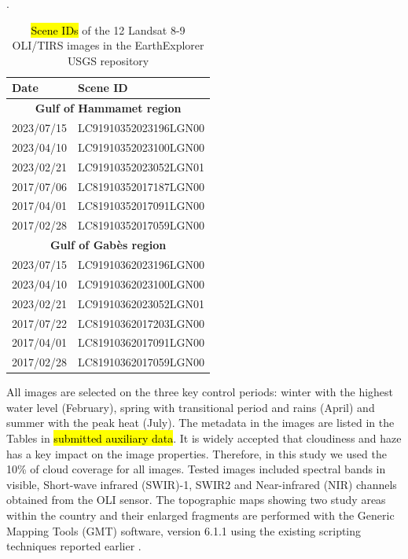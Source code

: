 \documentclass[land,article,submit,pdftex,moreauthors]{Definitions/mdpi}
\begin{document}
\begin{table}[H]
\caption{\hl{Scene IDs} of the 12 Landsat 8-9 OLI/TIRS images in the EarthExplorer USGS repository}.
\label{tab01}
\footnotesize
\begin{tabularx}{7cm}{l|l}

			\toprule
			\textbf{Date} & \textbf{Scene ID} \\
			\midrule
			\multicolumn{2}{c}{\textbf{Gulf of Hammamet region}}\\
			\midrule
			2023/07/15 & LC91910352023196LGN00 \\	
			2023/04/10 & LC91910352023100LGN00 \\	
			2023/02/21 & LC91910352023052LGN01 \\	
			2017/07/06 & LC81910352017187LGN00 \\	
			2017/04/01 & LC81910352017091LGN00 \\	
			2017/02/28 & LC81910352017059LGN00 \\	
			\midrule
			\multicolumn{2}{c}{\textbf{Gulf of Gabès region}}\\
			\midrule
			2023/07/15 & LC91910362023196LGN00 \\	
			2023/04/10 & LC91910362023100LGN00 \\	
			2023/02/21 & LC91910362023052LGN01 \\	
			2017/07/22 & LC81910362017203LGN00 \\
			2017/04/01 & LC81910362017091LGN00 \\
			2017/02/28 & LC81910362017059LGN00 \\
			\bottomrule
		\end{tabularx}
\end{table} 

All images are selected on the three key control periods: winter with the highest water level (February), spring with transitional period and rains (April) and summer with the peak heat (July). The metadata in the images are listed in the Tables in \hl{submitted auxiliary data}. It is widely accepted that cloudiness and haze has a key impact on the image properties. Therefore, in this study we used the 10\% of cloud coverage for all images. Tested images included spectral bands in visible, Short-wave infrared (SWIR)-1, SWIR2 and Near-infrared (NIR) channels obtained from the OLI sensor. The topographic maps showing two study areas within the country and their enlarged fragments are performed with the Generic Mapping Tools (GMT) software, version  6.1.1 \cite{Wessel} using the existing scripting techniques reported earlier \cite{Lemenkova202212,Lemenkova202206,Lemenkova202203}. 
\end{document}
